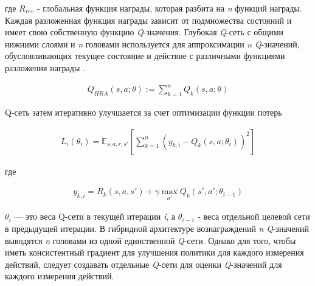 где $R_{rev}$ - глобальная функция награды, которая разбита на \textit{n} функций награды. Каждая разложенная функция награды зависит от подмножества состояний и имеет свою собственную функцию \textit{Q}-значения. Глубокая \textit{Q}-сеть с общими нижними слоями и \textit{n} головами используется для аппроксимации \textit{n} \textit{Q}-значений, обусловливающих текущее состояние и действие с различными функциями разложения награды .

\begin{equation}
    \begin{multlined}
        Q_{H R A}(s, a; \theta) := \sum^n_{k=1} Q_k(s, a;\theta)
    \end{multlined}
\end{equation}

Q-сеть затем итеративно улучшается за счет оптимизации функции потерь

\begin{equation}
    \begin{multlined}
        L_i(\theta_i) = \mathbb{E}_{s, a, r, s'}[\sum^n_{k=1}(y_{k, i}-Q_k(s, a;\theta_i))^2]
    \end{multlined}
\end{equation}

где

\begin{equation}
    \begin{multlined}
        y_{k, i} = R_k(s, a, s') + \gamma \max_{a'} Q_k(s', a';\theta_{i-1})
    \end{multlined}
\end{equation}

$\theta_i$ — это веса Q-сети в текущей итерации \textit{i}, а $\theta_{i-1}$ - веса отдельной целевой сети в предыдущей итерации.
В гибридной архитектуре вознаграждений \textit{n} \textit{Q}-значений выводятся \textit{n} головами из одной единственной \textit{Q}-сети. Однако для того, чтобы иметь консистентный градиент для улучшения политики для каждого измерения действий, следует создавать отдельные \textit{Q}-сети для оценки \textit{Q}-значений для каждого измерения действий.
